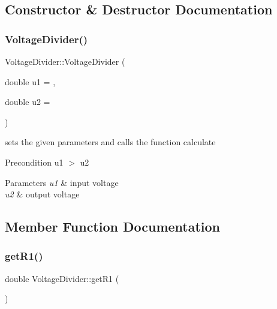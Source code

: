 \subsection{Constructor \& Destructor Documentation}
\mbox{\label{classVoltageDivider_a7e71609cdfe3faa54ddfde5c7634a92c}} 
\subsubsection{\texorpdfstring{Voltage\+Divider()}{VoltageDivider()}}
{\footnotesize\ttfamily Voltage\+Divider\+::\+Voltage\+Divider (\begin{DoxyParamCaption}\item[{double}]{u1 = {},  }\item[{double}]{u2 = {} }\end{DoxyParamCaption})}



sets the given parameters and calls the function calculate 

\begin{DoxyPrecond}{Precondition}
u1 $>$ u2 
\end{DoxyPrecond}

\begin{DoxyParams}{Parameters}
{\em u1} & input voltage \\
\hline
{\em u2} & output voltage \\
\hline
\end{DoxyParams}


\subsection{Member Function Documentation}
\mbox{\label{classVoltageDivider_ac9928564fe59e40e12346222a7eb82a2}} 
\subsubsection{\texorpdfstring{get\+R1()}{getR1()}}
{\footnotesize\ttfamily double Voltage\+Divider\+::get\+R1 (\begin{DoxyParamCaption}{ }\end{DoxyParamCaption})}




